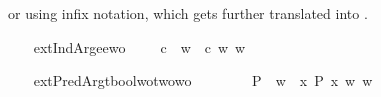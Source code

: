 \begin{isabellebody}
\begin{isamarkuptext}
{or  using infix notation, which gets further translated into .}%
\end{isamarkuptext}\isamarkuptrue%
%
\begin{isamarkuptext}%
%
\end{isamarkuptext}\isamarkuptrue%
\ \ \isamarkupfalse%
\ extIndArg{\isacharcolon}{\isacharcolon}{\isachardoublequoteopen}{\isasymup}{\isasymlangle}e{\isasymrangle}{\isasymRightarrow}{\isasymup}e{\isasymRightarrow}wo{\isachardoublequoteclose}\ {\isacharparenleft}\ {\isachardoublequoteopen}{\isasymdownharpoonleft}{\isachardoublequoteclose}{\isacharparenright}\ \ {\isachardoublequoteopen}{\isasymphi}\ {\isasymdownharpoonleft}c\ {\isasymequiv}\ {\isasymlambda}w{\isachardot}\ {\isasymphi}\ {\isacharparenleft}c\ w{\isacharparenright}\ w{\isachardoublequoteclose}%
\begin{isamarkuptext}%
%
\end{isamarkuptext}\isamarkuptrue%
\ \ \isamarkupfalse%
\ extPredArg{\isacharcolon}{\isacharcolon}{\isachardoublequoteopen}{\isacharparenleft}{\isacharparenleft}{\isacharprime}t{\isasymRightarrow}bool{\isacharparenright}{\isasymRightarrow}wo{\isacharparenright}{\isasymRightarrow}{\isacharparenleft}{\isacharprime}t{\isasymRightarrow}wo{\isacharparenright}{\isasymRightarrow}wo{\isachardoublequoteclose}\ {\isacharparenleft}\ {\isachardoublequoteopen}{\isasymdown}{\isachardoublequoteclose}{\isacharparenright}\isanewline
\ \ \ \ \ {\isachardoublequoteopen}{\isasymphi}\ {\isasymdown}P\ {\isasymequiv}\ {\isasymlambda}w{\isachardot}\ {\isasymphi}\ {\isacharparenleft}{\isasymlambda}x{\isachardot}\ P\ x\ w{\isacharparenright}\ w{\isachardoublequoteclose}%

\end{isabellebody}
